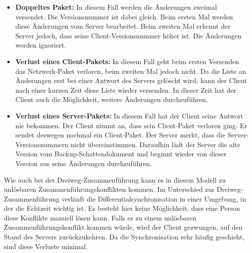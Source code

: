 \begin{itemize}
	\item \textbf{Doppeltes Paket:} In diesem Fall werden die Änderungen zweimal versendet. Die Versionsnummer ist dabei gleich. Beim ersten Mal werden diese Änderungen vom Server bearbeitet. Beim zweiten Mal erkennt der Server jedoch, dass seine Client-Versionsnummer höher ist. Die Änderungen werden ignoriert.
	\item \textbf{Verlust eines Client-Pakets:} In diesem Fall geht beim ersten Versenden das Netzwerk-Paket verloren, beim zweiten Mal jedoch nicht. Da die Liste an Änderungen erst bei einer Antwort des Servers gelöscht wird, kann der Client nach einer kurzen Zeit diese Liste wieder versenden. In dieser Zeit hat der Client auch die Möglichkeit, weitere Änderungen durchzuführen.
	\item \textbf{Verlust eines Server-Pakets:} In diesem Fall hat der Client seine Antwort nie bekommen. Der Client nimmt an, dass sein Client-Paket verloren ging. Er sendet deswegen nochmal ein Client-Paket. Der Server merkt, dass die Server-Versionsnummern nicht übereinstimmen. Daraufhin lädt der Server die alte Version vom Backup-Schattendokument und beginnt wieder von dieser Version aus seine Änderungen durchzuführen.
\end{itemize}

Wie auch bei der Dreiweg-Zusammenführung kann es in diesem Modell zu unlösbaren Zusammenführungskonflikten kommen. Im Unterschied zur Dreiweg-Zusammenführung verläuft die Differentialsynchronisation in einer Umgebung, in der die Echtzeit wichtig ist. Es besteht hier keine Möglichkeit, dass eine Person diese Konflikte manuell lösen kann. Falls es zu einem unlösbaren Zusammenführungskonflikt kommen würde, wird der Client gezwungen, auf den Stand des Servers zurückzukehren. Da die Synchronisation sehr häufig geschieht, sind diese Verluste minimal.




